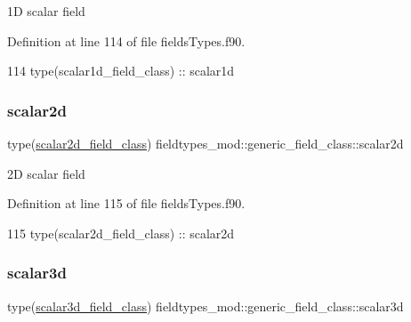 1D scalar field 



Definition at line 114 of file fields\+Types.\+f90.


\begin{DoxyCode}
114         \textcolor{keywordtype}{type}(scalar1d\_field\_class) :: scalar1d
\end{DoxyCode}
\mbox{\label{structfieldtypes__mod_1_1generic__field__class_ad4d960a63ab944d31c3a5c7538418d59}} 
\subsubsection{\texorpdfstring{scalar2d}{scalar2d}}
{\footnotesize\ttfamily type(\mbox{\hyperlink{structfieldtypes__mod_1_1scalar2d__field__class}{scalar2d\+\_\+field\+\_\+class}}) fieldtypes\+\_\+mod\+::generic\+\_\+field\+\_\+class\+::scalar2d\hspace{0.3cm}{\ttfamily [private]}}



2D scalar field 



Definition at line 115 of file fields\+Types.\+f90.


\begin{DoxyCode}
115         \textcolor{keywordtype}{type}(scalar2d\_field\_class) :: scalar2d
\end{DoxyCode}
\mbox{\label{structfieldtypes__mod_1_1generic__field__class_a8ffce3cc5f44742a29d0d9815301f218}} 
\subsubsection{\texorpdfstring{scalar3d}{scalar3d}}
{\footnotesize\ttfamily type(\mbox{\hyperlink{structfieldtypes__mod_1_1scalar3d__field__class}{scalar3d\+\_\+field\+\_\+class}}) fieldtypes\+\_\+mod\+::generic\+\_\+field\+\_\+class\+::scalar3d\hspace{0.3cm}{\ttfamily [private]}}



